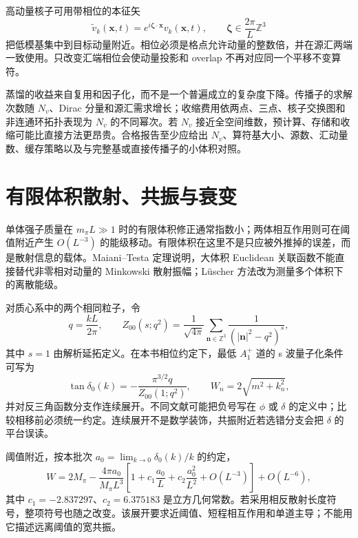 高动量核子可用带相位的本征矢
\begin{equation}
  \widetilde v_k(\mathbf x,t)
  =e^{i\boldsymbol\zeta\cdot\mathbf x}v_k(\mathbf x,t),
  \qquad
  \boldsymbol\zeta\in\frac{2\pi}{L}\mathbb Z^3
  \label{eq:b02-momentum-smearing}
\end{equation}
把低模基集中到目标动量附近。相位必须是格点允许动量的整数倍，并在源汇两端一致使用。只改变汇端相位会使动量投影和 overlap 不再对应同一个平移不变算符。

蒸馏的收益来自复用和因子化，而不是一个普遍成立的复杂度下降。传播子的求解次数随 \(N_v\)、Dirac 分量和源汇需求增长；收缩费用依两点、三点、核子交换图和非连通环拓扑表现为 \(N_v\) 的不同幂次。若 \(N_v\) 接近全空间维数，预计算、存储和收缩可能比直接方法更昂贵。合格报告至少应给出 \(N_v\)、算符基大小、源数、汇动量数、缓存策略以及与完整基或直接传播子的小体积对照。

\section{有限体积散射、共振与衰变}\label{subsec:b02-finite-volume}

单体强子质量在 \(m_\pi L\gg1\) 时的有限体积修正通常指数小；两体相互作用则可在阈值附近产生 \(O(L^{-3})\) 的能级移动。有限体积在这里不是只应被外推掉的误差，而是散射信息的载体。Maiani--Testa 定理说明，大体积 Euclidean 关联函数不能直接替代非零相对动量的 Minkowski 散射振幅；Lüscher 方法改为测量多个体积下的离散能级。

对质心系中的两个相同粒子，令
\begin{equation}
  q=\frac{kL}{2\pi},
  \qquad
  Z_{00}(s;q^2)
  =\frac{1}{\sqrt{4\pi}}
  \sum_{\mathbf n\in\mathbb Z^3}
  \frac{1}{(|\mathbf n|^2-q^2)^s},
  \label{eq:b02-zeta}
\end{equation}
其中 \(s=1\) 由解析延拓定义。在本书相位约定下，最低 \(A_1^+\) 道的 s 波量子化条件可写为
\begin{equation}
  \tan\delta_0(k)
  =-\frac{\pi^{3/2}q}{Z_{00}(1;q^2)},
  \qquad
  W_n=2\sqrt{m^2+k_n^2},
  \label{eq:b02-luscher-swave}
\end{equation}
并对反三角函数分支作连续展开。不同文献可能把负号写在 \(\phi\) 或 \(\delta\) 的定义中；比较相移前必须统一约定。连续展开不是数学装饰，共振附近若选错分支会把 \(\delta\) 的平台误读。

阈值附近，按本批次 \(a_0=\lim_{k\to0}\delta_0(k)/k\) 的约定，
\begin{equation}
  W
  =2M_\pi
  -\frac{4\pi a_0}{M_\pi L^3}
  \left[
  1+c_1\frac{a_0}{L}
  +c_2\frac{a_0^2}{L^2}
  +O(L^{-3})
  \right]
  +O(L^{-6}),
  \label{eq:b02-threshold}
\end{equation}
其中 \(c_1=-2.837297\)、\(c_2=6.375183\) 是立方几何常数。若采用相反散射长度符号，整项符号也随之改变。该展开要求近阈值、短程相互作用和单道主导；不能用它描述远离阈值的宽共振。

